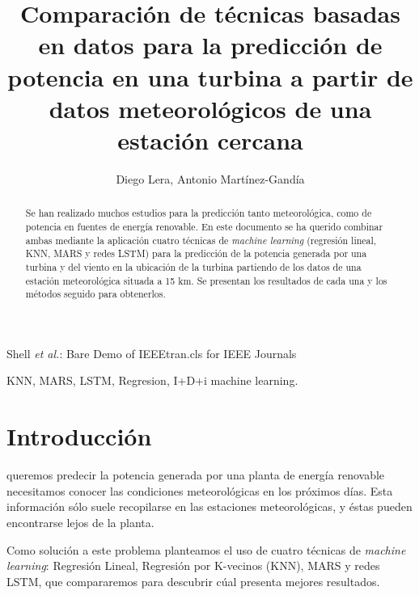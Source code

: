 \documentclass[journal]{IEEEtran}
\begin{document}
\title{Comparación de técnicas basadas en datos para la predicción de potencia en una turbina a partir de datos meteorológicos de una estación cercana}

\author{Diego Lera, Antonio Martínez-Gandía}%

%
{Shell \MakeLowercase{\textit{et al.}}: Bare Demo of IEEEtran.cls for IEEE Journals}

\maketitle

\begin{abstract}
Se han realizado muchos estudios para la predicción tanto meteorológica, como de potencia en fuentes de energía renovable. En este documento se ha querido combinar ambas mediante la aplicación cuatro técnicas de \emph{machine learning} (regresión lineal, KNN, MARS y redes LSTM) para la predicción de la potencia generada por una turbina y  del viento en la ubicación de la turbina partiendo de los datos de una estación meteorológica situada a 15 km. Se presentan los resultados de cada una y los métodos seguido para obtenerlos.
\end{abstract}

\begin{IEEEkeywords}
KNN, MARS, LSTM, Regresion, I+D+i machine learning.
\end{IEEEkeywords}







\IEEEpeerreviewmaketitle



\section{Introducción}
 queremos predecir la potencia generada por una planta de energía renovable necesitamos conocer las condiciones meteorológicas en los próximos días. Esta información sólo suele recopilarse en las estaciones meteorológicas, y éstas pueden encontrarse lejos de la planta. 

Como solución a este problema planteamos el uso de cuatro técnicas de \emph{machine learning}: Regresión Lineal, Regresión por K-vecinos (KNN), MARS y redes LSTM, que compararemos para descubrir cúal presenta mejores resultados.
\end{document}
